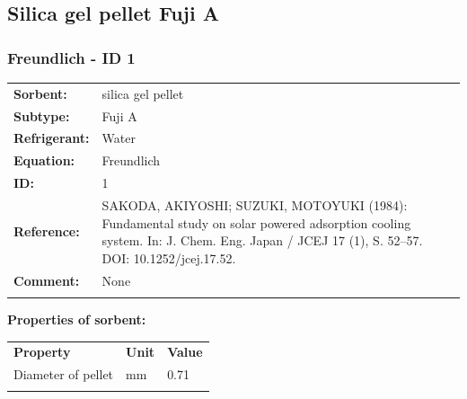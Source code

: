 \subsection{Silica gel pellet Fuji A}
%
\subsubsection{Freundlich - ID 1}
%
\begin{tabular}[l]{|lp{11.5cm}|}
\hline
\addlinespace

\textbf{Sorbent:} & silica gel pellet \\
\textbf{Subtype:} & Fuji A \\
\textbf{Refrigerant:} & Water \\
\textbf{Equation:} & Freundlich \\
\textbf{ID:} & 1 \\
\textbf{Reference:} & SAKODA, AKIYOSHI; SUZUKI, MOTOYUKI (1984): Fundamental study on solar powered adsorption cooling system. In: J. Chem. Eng. Japan / JCEJ 17 (1), S. 52–57. DOI: 10.1252/jcej.17.52. \\
\textbf{Comment:} & None \\

\addlinespace
\hline
\end{tabular}
\newline

\textbf{Properties of sorbent:}
\newline
%
\begin{longtable}[l]{lll}
\toprule
\addlinespace
\textbf{Property} & \textbf{Unit} & \textbf{Value} \\
\addlinespace
\midrule
\endhead
\bottomrule
\endfoot
\bottomrule
\endlastfoot
\addlinespace

Diameter of pellet & \si{\milli\meter} & 0.71\\

\addlinespace\end{longtable}

